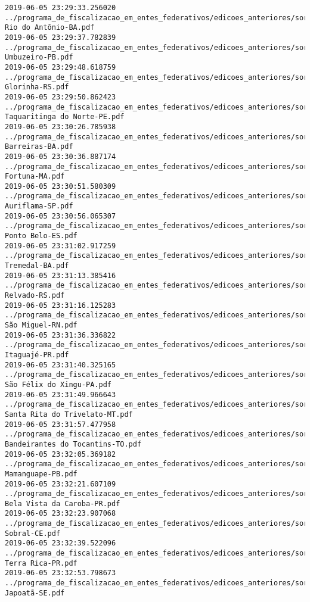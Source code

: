 \begin{lstlisting}
2019-06-05 23:29:33.256020 ../programa_de_fiscalizacao_em_entes_federativos/edicoes_anteriores/sorteio_35/1889-Rio do Antônio-BA.pdf
2019-06-05 23:29:37.782839 ../programa_de_fiscalizacao_em_entes_federativos/edicoes_anteriores/sorteio_35/1915-Umbuzeiro-PB.pdf
2019-06-05 23:29:48.618759 ../programa_de_fiscalizacao_em_entes_federativos/edicoes_anteriores/sorteio_35/1930-Glorinha-RS.pdf
2019-06-05 23:29:50.862423 ../programa_de_fiscalizacao_em_entes_federativos/edicoes_anteriores/sorteio_35/1918-Taquaritinga do Norte-PE.pdf
2019-06-05 23:30:26.785938 ../programa_de_fiscalizacao_em_entes_federativos/edicoes_anteriores/sorteio_35/1886-Barreiras-BA.pdf
2019-06-05 23:30:36.887174 ../programa_de_fiscalizacao_em_entes_federativos/edicoes_anteriores/sorteio_35/1899-Fortuna-MA.pdf
2019-06-05 23:30:51.580309 ../programa_de_fiscalizacao_em_entes_federativos/edicoes_anteriores/sorteio_35/1939-Auriflama-SP.pdf
2019-06-05 23:30:56.065307 ../programa_de_fiscalizacao_em_entes_federativos/edicoes_anteriores/sorteio_35/1895-Ponto Belo-ES.pdf
2019-06-05 23:31:02.917259 ../programa_de_fiscalizacao_em_entes_federativos/edicoes_anteriores/sorteio_35/1890-Tremedal-BA.pdf
2019-06-05 23:31:13.385416 ../programa_de_fiscalizacao_em_entes_federativos/edicoes_anteriores/sorteio_35/1932-Relvado-RS.pdf
2019-06-05 23:31:16.125283 ../programa_de_fiscalizacao_em_entes_federativos/edicoes_anteriores/sorteio_35/1927-São Miguel-RN.pdf
2019-06-05 23:31:36.336822 ../programa_de_fiscalizacao_em_entes_federativos/edicoes_anteriores/sorteio_35/1923-Itaguajé-PR.pdf
2019-06-05 23:31:40.325165 ../programa_de_fiscalizacao_em_entes_federativos/edicoes_anteriores/sorteio_35/1913-São Félix do Xingu-PA.pdf
2019-06-05 23:31:49.966643 ../programa_de_fiscalizacao_em_entes_federativos/edicoes_anteriores/sorteio_35/1910-Santa Rita do Trivelato-MT.pdf
2019-06-05 23:31:57.477958 ../programa_de_fiscalizacao_em_entes_federativos/edicoes_anteriores/sorteio_35/1944-Bandeirantes do Tocantins-TO.pdf
2019-06-05 23:32:05.369182 ../programa_de_fiscalizacao_em_entes_federativos/edicoes_anteriores/sorteio_36/2467-Mamanguape-PB.pdf
2019-06-05 23:32:21.607109 ../programa_de_fiscalizacao_em_entes_federativos/edicoes_anteriores/sorteio_36/2459-Bela Vista da Caroba-PR.pdf
2019-06-05 23:32:23.907068 ../programa_de_fiscalizacao_em_entes_federativos/edicoes_anteriores/sorteio_36/2491-Sobral-CE.pdf
2019-06-05 23:32:39.522096 ../programa_de_fiscalizacao_em_entes_federativos/edicoes_anteriores/sorteio_36/2477-Terra Rica-PR.pdf
2019-06-05 23:32:53.798673 ../programa_de_fiscalizacao_em_entes_federativos/edicoes_anteriores/sorteio_36/2489-Japoatã-SE.pdf

\end{lstlisting}
